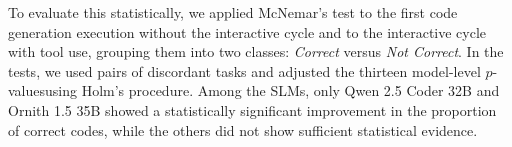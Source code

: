 To evaluate this statistically, we applied McNemar's test to the first code generation execution without the interactive cycle and to the interactive cycle with tool use, grouping them into two classes: \emph{Correct} versus \emph{Not Correct}. In the tests, we used pairs of discordant tasks and adjusted the thirteen model-level $p$-valuesusing Holm's procedure. Among the SLMs, only Qwen 2.5 Coder 32B and Ornith 1.5 35B showed a statistically significant improvement in the proportion of correct codes, while the others did not show sufficient statistical evidence.